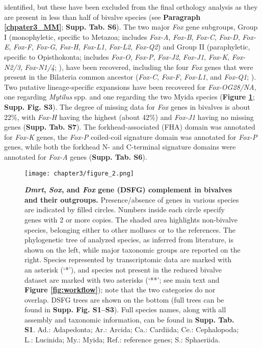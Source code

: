 \documentclass[../main.tex]{subfiles}
\begin{document}
identified, but these have been excluded from the final orthology analysis as they are present in less than half of bivalve species (see \textbf{Paragraph \ref{chpater3_MM}}; \textbf{Supp. Tab. S6}). The two major \textit{Fox} gene subgroups, Group I (monophyletic, specific to Metazoa; includes \textit{Fox-A}, \textit{Fox-B}, \textit{Fox-C}, \textit{Fox-D}, \textit{Fox-E}, \textit{Fox-F}, \textit{Fox-G}, \textit{Fox-H}, \textit{Fox-L1}, \textit{Fox-L2}, \textit{Fox-Q2}) and Group II (paraphyletic, specific to Opisthokonta; includes \textit{Fox-O}, \textit{Fox-P}, \textit{Fox-J2}, \textit{Fox-J1}, \textit{Fox-K}, \textit{Fox-N2/3}, \textit{Fox-N1/4}; \textbf{\cite{larroux2008genesis}}), have been recovered, including the four \textit{Fox} genes that were present in the Bilateria common ancestor (\textit{Fox-C}, \textit{Fox-F}, \textit{Fox-L1}, and \textit{Fox-Q1}; \textbf{\cite{shimeld2010clustered}}). Two putative lineage-specific expansions have been recovered for \textit{Fox-OG28/NA}, one regarding \textit{Mytilus} spp. and one regarding the two Myida species (\textbf{Figure \ref{fig:DSFG_bivalveCompilation}}; \textbf{Supp. Fig. S3}). The degree of missing data for \textit{Fox} genes in bivalves is about 22\%, with \textit{Fox-H} having the highest (about 42\%) and \textit{Fox-J1} having no missing genes (\textbf{Supp. Tab. S7}). The forkhead-associated (FHA) domain was annotated for \textit{Fox-K} genes, the \textit{Fox-P} coiled-coil signature domain was annotated for \textit{Fox-P} genes, while both the forkhead N- and C-terminal signature domains were annotated for \textit{Fox-A} genes (\textbf{Supp. Tab. S6}).

\begin{figure}
    \centering
    \texttt{[image: chapter3/figure\_2.png]}
    \captionsetup{width=\textwidth}
    \caption{
    \textbf{\textit{Dmrt}, \textit{Sox}, and \textit{Fox} gene (DSFG) complement in bivalves and their outgroups.} Presence/absence of genes in various species are indicated by filled circles. Numbers inside each circle specify genes with 2 or more copies. The shaded area highlights non-bivalve species, belonging either to other molluscs or to the references. The phylogenetic tree of analyzed species, as inferred from literature, is shown on the left, while major taxonomic groups are reported on the right. Species represented by transcriptomic data are marked with an asterisk (‘*’), and species not present in the reduced bivalve dataset are marked with two asterisks (‘**’; see main text and \textbf{Figure \ref{fig:workflow}}); note that the two categories do nor overlap. DSFG trees are shown on the bottom (full trees can be found in \textbf{Supp. Fig. S1--S3}). Full species names, along with all assembly and taxonomic information, can be found in \textbf{Supp. Tab. S1}.  Ad.: Adapedonta; Ar.: Arcida; Ca.: Cardiida; Ce.: Cephalopoda; L.: Lucinida; My.: Myida; Ref.: reference genes; S.: Sphaeriida.
    }
    \label{fig:DSFG_bivalveCompilation}
\end{figure}
\end{document}
